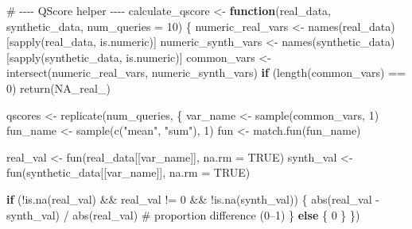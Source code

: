 \documentclass[
  letterpaper,
  DIV=11,
  numbers=noendperiod]{scrartcl}
\newenvironment{Shaded}{\begin{snugshade}}{\end{snugshade}}
\newcommand{\AttributeTok}[1]{\textcolor[rgb]{0.40,0.45,0.13}{#1}}
\newcommand{\CommentTok}[1]{\textcolor[rgb]{0.37,0.37,0.37}{#1}}
\newcommand{\ConstantTok}[1]{\textcolor[rgb]{0.56,0.35,0.01}{#1}}
\newcommand{\ControlFlowTok}[1]{\textcolor[rgb]{0.00,0.23,0.31}{\textbf{#1}}}
\newcommand{\DecValTok}[1]{\textcolor[rgb]{0.68,0.00,0.00}{#1}}
\newcommand{\FunctionTok}[1]{\textcolor[rgb]{0.28,0.35,0.67}{#1}}
\newcommand{\NormalTok}[1]{\textcolor[rgb]{0.00,0.23,0.31}{#1}}
\newcommand{\OtherTok}[1]{\textcolor[rgb]{0.00,0.23,0.31}{#1}}
\newcommand{\SpecialCharTok}[1]{\textcolor[rgb]{0.37,0.37,0.37}{#1}}
\newcommand{\StringTok}[1]{\textcolor[rgb]{0.13,0.47,0.30}{#1}}
\begin{document}
\begin{Shaded}
\begin{Highlighting}[]
\CommentTok{\# {-}{-}{-}{-} QScore helper {-}{-}{-}{-}}
\NormalTok{calculate\_qscore }\OtherTok{\textless{}{-}} \ControlFlowTok{function}\NormalTok{(real\_data, synthetic\_data, }\AttributeTok{num\_queries =} \DecValTok{10}\NormalTok{) \{}
\NormalTok{  numeric\_real\_vars  }\OtherTok{\textless{}{-}} \FunctionTok{names}\NormalTok{(real\_data)[}\FunctionTok{sapply}\NormalTok{(real\_data, is.numeric)]}
\NormalTok{  numeric\_synth\_vars }\OtherTok{\textless{}{-}} \FunctionTok{names}\NormalTok{(synthetic\_data)[}\FunctionTok{sapply}\NormalTok{(synthetic\_data, is.numeric)]}
\NormalTok{  common\_vars }\OtherTok{\textless{}{-}} \FunctionTok{intersect}\NormalTok{(numeric\_real\_vars, numeric\_synth\_vars)}
  \ControlFlowTok{if}\NormalTok{ (}\FunctionTok{length}\NormalTok{(common\_vars) }\SpecialCharTok{==} \DecValTok{0}\NormalTok{) }\FunctionTok{return}\NormalTok{(}\ConstantTok{NA\_real\_}\NormalTok{)}

\NormalTok{  qscores }\OtherTok{\textless{}{-}} \FunctionTok{replicate}\NormalTok{(num\_queries, \{}
\NormalTok{    var\_name }\OtherTok{\textless{}{-}} \FunctionTok{sample}\NormalTok{(common\_vars, }\DecValTok{1}\NormalTok{)}
\NormalTok{    fun\_name }\OtherTok{\textless{}{-}} \FunctionTok{sample}\NormalTok{(}\FunctionTok{c}\NormalTok{(}\StringTok{"mean"}\NormalTok{, }\StringTok{"sum"}\NormalTok{), }\DecValTok{1}\NormalTok{)}
\NormalTok{    fun      }\OtherTok{\textless{}{-}} \FunctionTok{match.fun}\NormalTok{(fun\_name)}

\NormalTok{    real\_val  }\OtherTok{\textless{}{-}} \FunctionTok{fun}\NormalTok{(real\_data[[var\_name]],  }\AttributeTok{na.rm =} \ConstantTok{TRUE}\NormalTok{)}
\NormalTok{    synth\_val }\OtherTok{\textless{}{-}} \FunctionTok{fun}\NormalTok{(synthetic\_data[[var\_name]], }\AttributeTok{na.rm =} \ConstantTok{TRUE}\NormalTok{)}

    \ControlFlowTok{if}\NormalTok{ (}\SpecialCharTok{!}\FunctionTok{is.na}\NormalTok{(real\_val) }\SpecialCharTok{\&\&}\NormalTok{ real\_val }\SpecialCharTok{!=} \DecValTok{0} \SpecialCharTok{\&\&} \SpecialCharTok{!}\FunctionTok{is.na}\NormalTok{(synth\_val)) \{}
      \FunctionTok{abs}\NormalTok{(real\_val }\SpecialCharTok{{-}}\NormalTok{ synth\_val) }\SpecialCharTok{/} \FunctionTok{abs}\NormalTok{(real\_val)  }\CommentTok{\# proportion difference (0–1)}
\NormalTok{    \} }\ControlFlowTok{else}\NormalTok{ \{}
      \DecValTok{0}
\NormalTok{    \}}
\NormalTok{  \})}


\end{Highlighting}
\end{Shaded}
\end{document}
